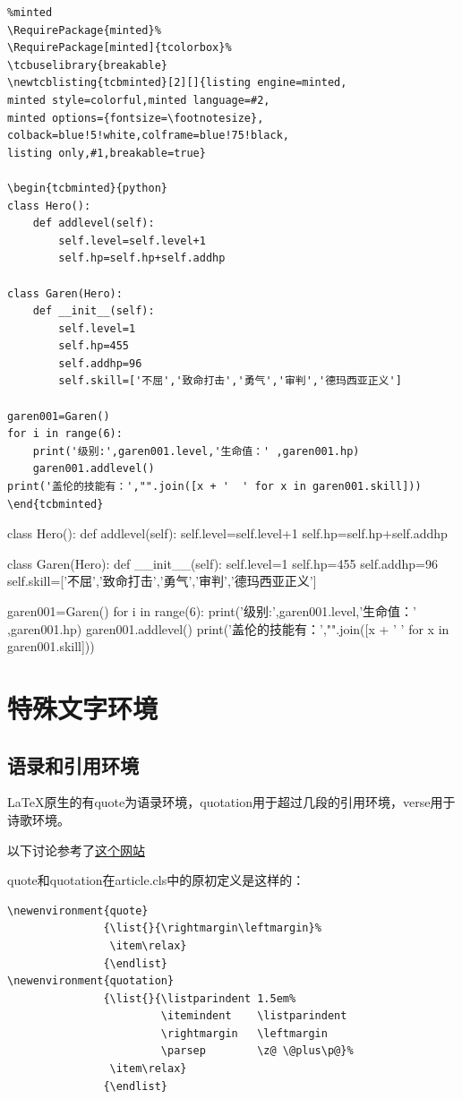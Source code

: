 \documentclass[11pt,oneside]{book}
\begin{document}
\begin{Verbatim}
%minted
\RequirePackage{minted}%
\RequirePackage[minted]{tcolorbox}%
\tcbuselibrary{breakable}
\newtcblisting{tcbminted}[2][]{listing engine=minted,
minted style=colorful,minted language=#2,
minted options={fontsize=\footnotesize},
colback=blue!5!white,colframe=blue!75!black,
listing only,#1,breakable=true}

\begin{tcbminted}{python}
class Hero():
    def addlevel(self):
        self.level=self.level+1
        self.hp=self.hp+self.addhp

class Garen(Hero):
    def __init__(self):
        self.level=1
        self.hp=455
        self.addhp=96
        self.skill=['不屈','致命打击','勇气','审判','德玛西亚正义']

garen001=Garen()
for i in range(6):
    print('级别:',garen001.level,'生命值：' ,garen001.hp)
    garen001.addlevel()
print('盖伦的技能有：',"".join([x + '  ' for x in garen001.skill]))
\end{tcbminted}
\end{Verbatim}

\begin{tcbpython}[]
class Hero():
    def addlevel(self):
        self.level=self.level+1
        self.hp=self.hp+self.addhp

class Garen(Hero):
    def __init__(self):
        self.level=1
        self.hp=455
        self.addhp=96
        self.skill=['不屈','致命打击','勇气','审判','德玛西亚正义']

garen001=Garen()
for i in range(6):
    print('级别:',garen001.level,'生命值：' ,garen001.hp)
    garen001.addlevel()
print('盖伦的技能有：',"".join([x + '  ' for x in garen001.skill]))
\end{tcbpython}



\chapter{特殊文字环境}
\section{语录和引用环境}
\LaTeX 原生的有quote为语录环境，quotation用于超过几段的引用环境，verse用于诗歌环境。

以下讨论参考了\href{http://tex.stackexchange.com/questions/33219/whats-the-difference-between-the-environments-quote-and-quotation}{这个网站}

quote和quotation在article.cls中的原初定义是这样的：
\begin{Verbatim}
\newenvironment{quote}
               {\list{}{\rightmargin\leftmargin}%
                \item\relax}
               {\endlist}
\newenvironment{quotation}
               {\list{}{\listparindent 1.5em%
                        \itemindent    \listparindent
                        \rightmargin   \leftmargin
                        \parsep        \z@ \@plus\p@}%
                \item\relax}
               {\endlist}
\end{Verbatim}
\end{document}

